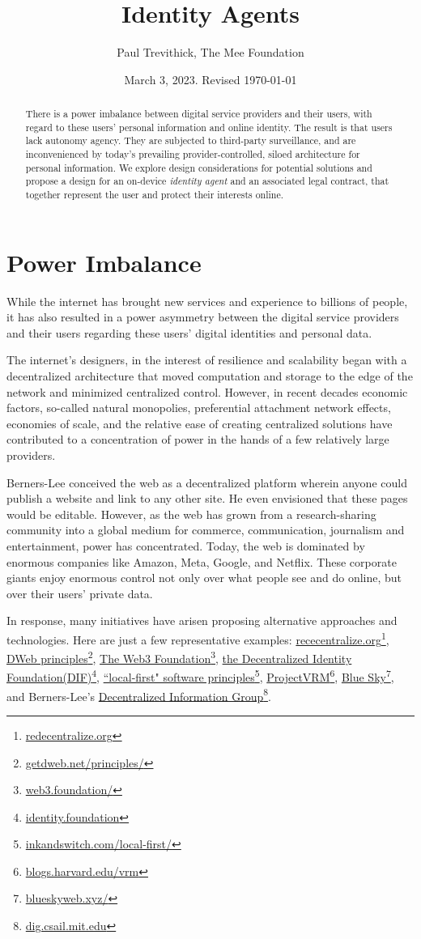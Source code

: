 \documentclass[11pt, oneside]{article}   	%
\title{Identity Agents}
\author{Paul Trevithick, The Mee Foundation}
\date{March 3, 2023. Revised \today}
\newcommand{\hyperfootnote}[1][]{\def\ArgI{{#1}}\hyperfootnoteRelay}
\newcommand\hyperfootnoteRelay[2][]{\href{#1#2}{\ArgI}\footnote{\href{#1#2}{#2}}}
\begin{document}
\maketitle
\begin{abstract}
There is a power imbalance between digital service providers and their users, with regard to these users' personal information and online identity. The result is that users lack autonomy agency. They are subjected to third-party surveillance, and are inconvenienced by today's prevailing provider-controlled, siloed architecture for personal information. We explore design considerations for potential solutions and propose a design for an on-device \emph{identity agent} and an associated legal contract, that together represent the user and protect their interests online.
\end{abstract}

\section{Power Imbalance}
While the internet has brought new services and experience to billions of people, it has also resulted in a power asymmetry between the digital service providers and their users regarding these users' digital identities and personal data. 

The internet's designers, in the interest of resilience and scalability began with a decentralized architecture that moved computation and storage to the edge of the network and minimized centralized control. However, in recent decades economic factors, so-called natural monopolies, preferential attachment network effects, economies of scale, and the relative ease of creating centralized solutions have contributed to a concentration of power in the hands of a few relatively large providers. 

Berners-Lee conceived the web as a decentralized platform wherein anyone could publish a website and link to any other site. He even envisioned that these pages would be editable. However, as the web has grown from a research-sharing community into a global medium for commerce, communication, journalism and entertainment, power has concentrated. Today, the web is dominated by enormous companies like Amazon, Meta, Google, and Netflix. These corporate giants enjoy enormous control not only over what people see and do online, but over their users' private data.\cite{Finley2017}

In response, many initiatives have arisen proposing alternative approaches and technologies. Here are just a few representative examples: \hyperfootnote[rececentralize.org][https://]{redecentralize.org}, \hyperfootnote[DWeb principles][https://]{getdweb.net/principles/}, \hyperfootnote[The Web3 Foundation][https://]{web3.foundation/}, \hyperfootnote[the Decentralized Identity Foundation(DIF)][https://]{identity.foundation}, \hyperfootnote[``local-first" software principles][https://]{inkandswitch.com/local-first/}, \hyperfootnote[ProjectVRM][https://]{blogs.harvard.edu/vrm}, \hyperfootnote[Blue Sky][https://]{blueskyweb.xyz/}, and Berners-Lee's \hyperfootnote[Decentralized Information Group][https://]{dig.csail.mit.edu}. 
\end{document}
